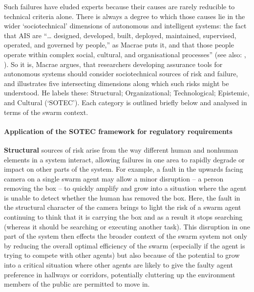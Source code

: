 \documentclass[lettersize,journal]{IEEEtran}
\begin{document}
Such failures have eluded experts because their causes are rarely reducible to technical criteria alone. There is always a degree to which those causes lie in the wider `sociotechnical’ dimensions of autonomous and intelligent systems: the fact that AIS are ``… designed, developed, built, deployed, maintained, supervised, operated, and governed by people,” as Macrae \cite{macrae2021learning} puts it, and that those people operate within complex social, cultural, and organisational processes” (see also: \cite{pettersen2021organizational}, \cite{reason2016managing}). So it is, Macrae \cite{macrae2021learning} argues, that researchers developing assurance tools for autonomous systems should consider sociotechnical sources of risk and failure, and illustrates five intersecting dimensions along which such risks might be understood. He labels these: Structural; Organizational; Technological; Epistemic, and Cultural (‘SOTEC’). Each category is outlined briefly below and  analysed in terms of the swarm context.
\\
\paragraph*{Application of the SOTEC framework for regulatory requirements}
\textbf{Structural} sources of risk arise from the way different human and nonhuman elements in a system interact, allowing failures in one area to rapidly degrade or impact on other parts of the system. For example, a fault in the upwards facing camera on a single swarm agent may allow a minor disruption – a person removing the box – to quickly amplify and grow into a situation where the agent is unable to detect whether the human has removed the box. Here, the fault in the structural character of the camera brings to light the risk of a swarm agent continuing to think that it is carrying the box and as a result it stops searching (whereas it should be searching or executing another task). This disruption in one part of the system then effects the broader context of the swarm system not only by reducing the overall optimal efficiency of the swarm (especially if the agent is trying to compete with other agents) but also because of the potential to grow into a critical situation where other agents are likely to give the faulty agent preference in hallways or corridors, potentially cluttering up the environment members of the public are permitted to move in. 
\end{document}
